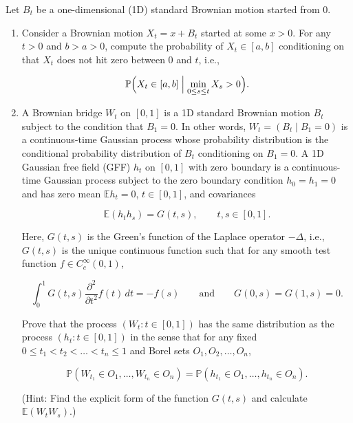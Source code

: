 \documentclass[11pt,a4paper]{article}
\newcommand{\examstatement}[1]{%
  \par\addvspace{0.85em}%
  \noindent{\bfseries #1}\par\nobreak\addvspace{0.28em}%
}
\begin{document}
\examstatement{Problem 6. [15 pts.]}
Let \( B_t \) be a one-dimensional (1D) standard Brownian motion started from 0.
\begin{enumerate}[label=(\alph*)]
    \item Consider a Brownian motion \( X_t = x + B_t \) started at some \( x > 0 \). For any \( t > 0 \) and \( b > a > 0 \), compute the probability of \( X_t \in [a, b] \) conditioning on that \( X_t \) does not hit zero between 0 and \( t \), i.e.,

    \[
    \mathbb{P}\Bigl( X_t \in [a, b] \Bigm| \min_{0 \le s \le t} X_s > 0 \Bigr).
    \]
    \item A Brownian bridge \( W_t \) on \( [0, 1] \) is a 1D standard Brownian motion \( B_t \) subject to the condition that \( B_1 = 0 \). In other words, \( W_t = (B_t \mid B_1 = 0) \) is a continuous-time Gaussian process whose probability distribution is the conditional probability distribution of \( B_t \) conditioning on \( B_1 = 0 \). A 1D Gaussian free field (GFF) \( h_t \) on \( [0, 1] \) with zero boundary is a continuous-time Gaussian process subject to the zero boundary condition \( h_0 = h_1 = 0 \) and has zero mean \( \mathbb{E} h_t = 0 \), \( t \in [0, 1] \), and covariances

    \[
    \mathbb{E}(h_t h_s) = G(t, s), \qquad t, s \in [0, 1].
    \]

    Here, \( G(t, s) \) is the Green's function of the Laplace operator \( -\Delta \), i.e., \( G(t, s) \) is the unique continuous function such that for any smooth test function \( f \in C_c^\infty(0, 1) \),

    \[
    \int_0^1 G(t, s) \frac{\partial^2}{\partial t^2} f(t)\, dt = -f(s) \qquad \text{and} \qquad G(0, s) = G(1, s) = 0.
    \]

    Prove that the process \( (W_t : t \in [0, 1]) \) has the same distribution as the process \( (h_t : t \in [0, 1]) \) in the sense that for any fixed \( 0 \le t_1 < t_2 < \dots < t_n \le 1 \) and Borel sets \( O_1, O_2, \dots, O_n \),

    \[
    \mathbb{P}(W_{t_1} \in O_1, \dots, W_{t_n} \in O_n) = \mathbb{P}(h_{t_1} \in O_1, \dots, h_{t_n} \in O_n).
    \]

    (Hint: Find the explicit form of the function \( G(t, s) \) and calculate \( \mathbb{E}(W_t W_s) \).)
\end{enumerate}
\end{document}
